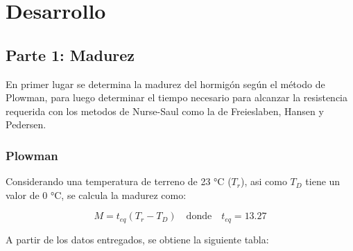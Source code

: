 \section{Desarrollo}

\subsection*{Parte 1: Madurez}

En primer lugar se determina la madurez del hormigón según el método de Plowman, para luego determinar el tiempo necesario para alcanzar la resistencia requerida con los metodos de Nurse-Saul como la de Freieslaben, Hansen y Pedersen.

\subsubsection*{Plowman}

Considerando una temperatura de terreno de 23 °C ($T_r$), asi como $T_D$ tiene un valor de 0 °C, se calcula la madurez como:

\begin{equation}
    M = t_{eq} (T_r - T_D) \quad \text{donde} \quad t_{eq} = 13.27
\end{equation}

A partir de los datos entregados, se obtiene la siguiente tabla:

